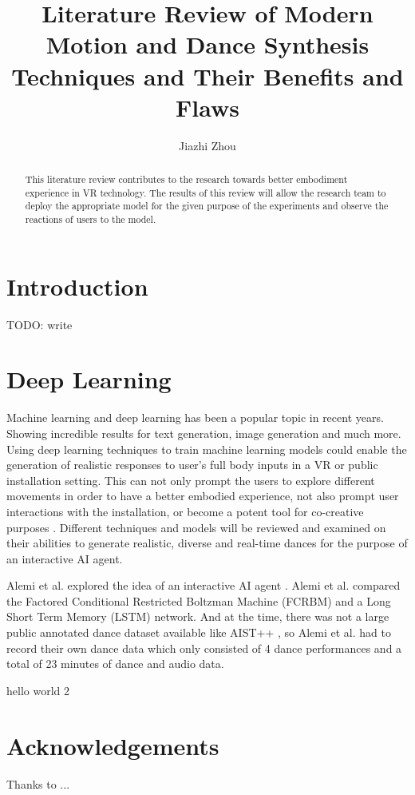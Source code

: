 \documentclass[final,5p,times,twocolumn,authoryear]{article}
\begin{document}
\title{Literature Review of Modern Motion and Dance Synthesis Techniques and Their Benefits and Flaws}
\author{Jiazhi Zhou}
\maketitle

\begin{abstract}

This literature review contributes to the research towards better embodiment experience in VR technology. The results of this review will allow the research team to deploy the appropriate model for the given purpose of the experiments and observe the reactions of users to the model.

\end{abstract}

\section{Introduction}

TODO: write

\section{Deep Learning}

Machine learning and deep learning has been a popular topic in recent years. Showing incredible results for text generation, image generation and much more.
Using deep learning techniques to train machine learning models could enable the generation of realistic responses to user's full body inputs in a VR or public installation setting.
This can not only prompt the users to explore different movements in order to have a better embodied experience, not also prompt user interactions with the installation, or become a potent tool for co-creative purposes \cite{Wallace2023}.
Different techniques and models will be reviewed and examined on their abilities to generate realistic, diverse and real-time dances for the purpose of an interactive AI agent.

Alemi et al. explored the idea of an interactive AI agent \cite{Alemi2017}. Alemi et al. compared the Factored Conditional Restricted Boltzman Machine (FCRBM) and a Long Short Term Memory (LSTM) network. And at the time, there was not a large public annotated dance dataset available like AIST++ \cite{Li2021}, so Alemi et al. had to record their own dance data which only consisted of 4 dance performances and a total of 23 minutes of dance and audio data.

hello world 2

\section*{Acknowledgements}
Thanks to ...

 

\end{document}
